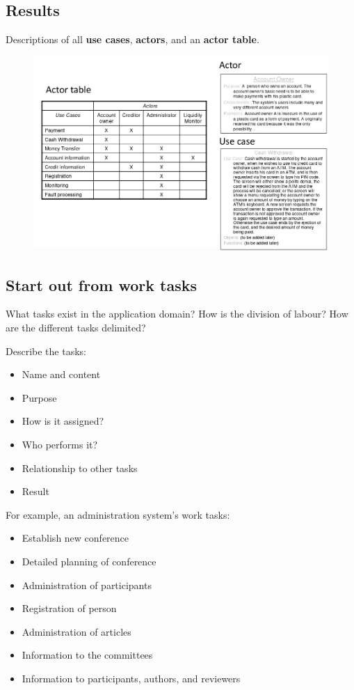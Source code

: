 \subsection{Results}
Descriptions of all \textbf{use cases}, \textbf{actors}, and an \textbf{actor table}.
\begin{figure}[H]
    \centering
    \includegraphics[width=\textwidth]{figures/usageresults.png}
\end{figure}

\subsection{Start out from work tasks}
What tasks exist in the application domain? How is the division of labour? How are the different tasks delimited?

\noindent Describe the tasks:

\begin{itemize}
    \item Name and content
    \item Purpose
    \item How is it assigned?
    \item Who performs it?
    \item Relationship to other tasks
    \item Result
\end{itemize}

For example, an administration system's work tasks:

\begin{itemize}
    \item Establish new conference
    \item Detailed planning of conference
    \item Administration of participants
    \item Registration of person
    \item Administration of articles
    \item Information to the committees
    \item Information to participants, authors, and reviewers
\end{itemize}

